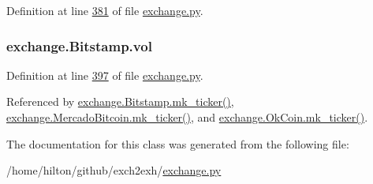 Definition at line \hyperlink{exchange_8py_source_l00381}{381} of file \hyperlink{exchange_8py_source}{exchange.\+py}.

\subsubsection[{\texorpdfstring{vol}{vol}}]{\setlength{\rightskip}{0pt plus 5cm}exchange.\+Bitstamp.\+vol}\hypertarget{classexchange_1_1_bitstamp_a4ddf3680f552a7d634b3bbea809cc606}{}\label{classexchange_1_1_bitstamp_a4ddf3680f552a7d634b3bbea809cc606}


Definition at line \hyperlink{exchange_8py_source_l00397}{397} of file \hyperlink{exchange_8py_source}{exchange.\+py}.



Referenced by \hyperlink{exchange_8py_source_l00415}{exchange.\+Bitstamp.\+mk\+\_\+ticker()}, \hyperlink{exchange_8py_source_l00549}{exchange.\+Mercado\+Bitcoin.\+mk\+\_\+ticker()}, and \hyperlink{exchange_8py_source_l00614}{exchange.\+Ok\+Coin.\+mk\+\_\+ticker()}.



The documentation for this class was generated from the following file\+:\begin{DoxyCompactItemize}
\item 
/home/hilton/github/exch2exh/\hyperlink{exchange_8py}{exchange.\+py}\end{DoxyCompactItemize}
